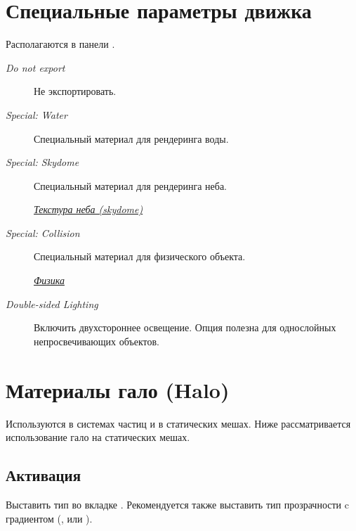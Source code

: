 \documentclass[a4paper,12pt,oneside]{sphinxmanual}
\begin{document}

\section{Специальные параметры движка}
\label{materials:id13}\label{materials:index-9}
Располагаются в панели .
\begin{description}
\item[{\emph{Do not export}}] \leavevmode
Не экспортировать.

\item[{\emph{Special: Water}}] \leavevmode
Специальный материал для рендеринга воды.

\item[{\emph{Special: Skydome}}] \leavevmode
Специальный материал для рендеринга неба.




{\hyperref[textures:skydome-texture]{\emph{Текстура неба (skydome)}}}



\item[{\emph{Special: Collision}}] \leavevmode
Специальный материал для физического объекта.




{\hyperref[physics:physics]{\emph{Физика}}}



\item[{\emph{Double-sided Lighting}}] \leavevmode
Включить двухстороннее освещение. Опция полезна для однослойных непросвечивающих объектов.

\end{description}


\section{Материалы гало (Halo)}
\label{materials:material-halo}\label{materials:index-10}\label{materials:halo}
Используются в системах частиц и в статических мешах. Ниже рассматривается использование гало на статических мешах.


\subsection{Активация}
\label{materials:id14}
Выставить тип  во вкладке . Рекомендуется также выставить тип прозрачности c градиентом (,  или ).
\end{document}
